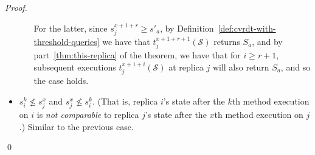 \begin{proof}
\begin{itemize}
\begin{itemize}
For the latter, since $s^{x+1+r}_j \geq s'_a$, by
Definition~\ref{def:cvrdt-with-threshold-queries} we have that
$t^{x+1+r+1}_j(\mathcal{S})$ returns $S_a$, and by
part~\ref{thm:this-replica} of the theorem, we have that for $i \geq
r+1$, subsequent executions $t^{x+1+i}_j(\mathcal{S})$ at replica $j$
will also return $S_a$, and so the case holds.
\end{itemize}

\item $s^k_i \nleq s^x_j$ and $s^x_j \nleq s^k_i$.
(That is, replica $i$'s state after the $k$th method execution on $i$
is \emph{not comparable} to replica $j$'s state after the $x$th method
execution on $j$.)  Similar to the previous case.
\end{itemize}
\qed
\end{proof}

